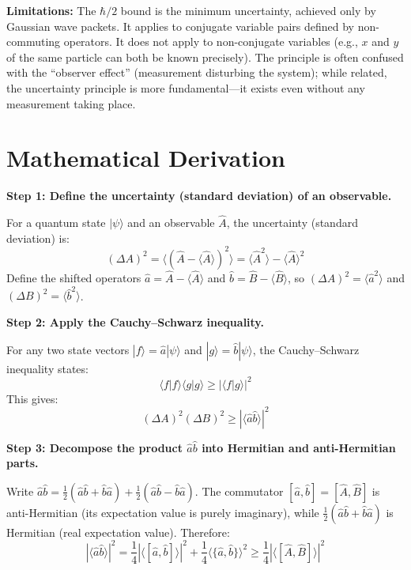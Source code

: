 \textbf{Limitations:} The $\hbar/2$ bound is the minimum uncertainty, achieved only by Gaussian wave packets. It applies to conjugate variable pairs defined by non-commuting operators. It does not apply to non-conjugate variables (e.g., $x$ and $y$ of the same particle can both be known precisely). The principle is often confused with the ``observer effect'' (measurement disturbing the system); while related, the uncertainty principle is more fundamental---it exists even without any measurement taking place.


\section*{Mathematical Derivation}

\textbf{Step 1: Define the uncertainty (standard deviation) of an observable.}

For a quantum state $|\psi\rangle$ and an observable $\hat{A}$, the uncertainty (standard deviation) is:
\begin{equation}
(\Delta A)^2 = \langle(\hat{A}-\langle\hat{A}\rangle)^2\rangle = \langle\hat{A}^2\rangle - \langle\hat{A}\rangle^2
\end{equation}
Define the shifted operators $\hat{a} = \hat{A} - \langle\hat{A}\rangle$ and $\hat{b} = \hat{B} - \langle\hat{B}\rangle$, so $(\Delta A)^2 = \langle\hat{a}^2\rangle$ and $(\Delta B)^2 = \langle\hat{b}^2\rangle$.

\textbf{Step 2: Apply the Cauchy--Schwarz inequality.}

For any two state vectors $|f\rangle = \hat{a}|\psi\rangle$ and $|g\rangle = \hat{b}|\psi\rangle$, the Cauchy--Schwarz inequality states:
\begin{equation}
\langle f|f\rangle\langle g|g\rangle \geq |\langle f|g\rangle|^2
\end{equation}
This gives:
\begin{equation}
(\Delta A)^2(\Delta B)^2 \geq |\langle\hat{a}\hat{b}\rangle|^2
\end{equation}

\textbf{Step 3: Decompose the product $\hat{a}\hat{b}$ into Hermitian and anti-Hermitian parts.}

Write $\hat{a}\hat{b} = \frac{1}{2}(\hat{a}\hat{b} + \hat{b}\hat{a}) + \frac{1}{2}(\hat{a}\hat{b} - \hat{b}\hat{a})$. The commutator $[\hat{a},\hat{b}] = [\hat{A},\hat{B}]$ is anti-Hermitian (its expectation value is purely imaginary), while $\frac{1}{2}(\hat{a}\hat{b} + \hat{b}\hat{a})$ is Hermitian (real expectation value). Therefore:
\begin{equation}
|\langle\hat{a}\hat{b}\rangle|^2 = \frac{1}{4}|\langle[\hat{a},\hat{b}]\rangle|^2 + \frac{1}{4}\langle\{\hat{a},\hat{b}\}\rangle^2 \geq \frac{1}{4}|\langle[\hat{A},\hat{B}]\rangle|^2
\end{equation}

